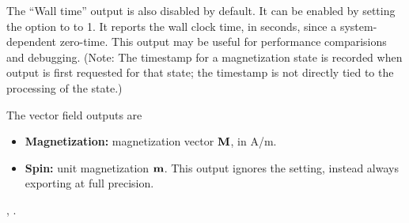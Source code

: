 \begin{description}
The ``Wall time'' output is also disabled by default.  It can be enabled
by setting the  option to to 1.  It reports
the wall clock time, in seconds, since a system-dependent zero-time.
This output may be useful for performance comparisions and
debugging. (Note: The timestamp for a magnetization state is recorded
when output is first requested for that state; the timestamp is not
directly tied to the processing of the state.)

The vector field outputs are
\begin{itemize}
\item \textbf{Magnetization:} magnetization vector $\textbf{M}$, in A/m.
\item \textbf{Spin:} unit magnetization $\textbf{m}$.  This output ignores the
  setting, instead
always exporting at full precision.
\end{itemize}

\begin{ExampleMifs}
  , .
\end{ExampleMifs}


\end{description}
